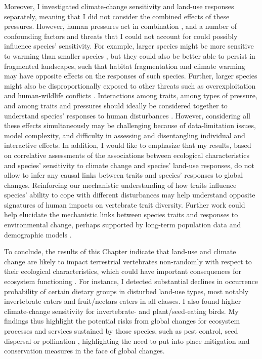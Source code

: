 Moreover, I investigated climate-change sensitivity and land-use responses separately, meaning that I did not consider the combined effects of these pressures. However, human pressures act in combination \citep{Segan2016, Harfoot2021, Capdevila2022b}, and a number of confounding factors and threats that I could not account for could possibly influence species' sensitivity. For example, larger species might be more sensitive to warming than smaller species \citep{Merckx2018, Hantak2021}, but they could also be better able to persist in fragmented landscapes, such that habitat fragmentation and climate warming may have opposite effects on the responses of such species. Further, larger species might also be disproportionally exposed to other threats such as overexploitation and human-wildlife conflicts \citep{Ripple2014, Ripple2017}. Interactions among traits, among types of pressure, and among traits and pressures should ideally be considered together to understand species' responses to human disturbances \citep{Hantak2021}. However, considering all these effects simultaneously may be challenging because of data-limitation issues, model complexity, and difficulty in assessing and disentangling individual and interactive effects. In addition, I would like to emphasize that my results, based on correlative assessments of the associations between ecological characteristics and species' sensitivity to climate change and species' land-use responses, do not allow to infer any causal links between traits and species' responses to global changes. Reinforcing our mechanistic understanding of how traits influence species' ability to cope with different disturbances may help understand opposite signatures of human impacts on vertebrate trait diversity. Further work could help elucidate the mechanistic links between species traits and responses to environmental change, perhaps supported by long-term population data and demographic models \citep{HernandezYanez2022}.

To conclude, the results of this Chapter indicate that land-use and climate change are likely to impact terrestrial vertebrates non-randomly with respect to their ecological characteristics, which could have important consequences for ecosystem functioning \citep{Duffy2003, Luck2012}. For instance, I detected substantial declines in occurrence probability of certain dietary groups in disturbed land-use types, most notably invertebrate eaters and fruit/nectars eaters in all classes. I also found higher climate-change sensitivity for invertebrate- and plant/seed-eating birds. My findings thus highlight the potential risks from global changes for ecosystem processes and services sustained by those species, such as pest control, seed dispersal or pollination \citep{Civantos2012, GonzalezVaro2013, Fricke2022}, highlighting the need to put into place mitigation and conservation measures in the face of global changes. 

